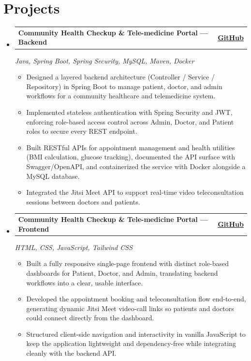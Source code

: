 \documentclass[letterpaper,11pt]{article}
\makeatletter
\newcommand{\resumeItem}[1]{
  \item{#1}
}
\newcommand{\resumeProjectHeading}[3]{
    \item
    \begin{tabular*}{\textwidth}{l@{\extracolsep{\fill}}r}
      \textbf{\large #1} & \textbf{#2} \\
    \end{tabular*}
    \textit{#3}
    \vspace{2pt}
}
\newcommand{\resumeSubHeadingListStart}{\begin{itemize}[leftmargin=0.0in, label={}, itemsep=6pt, topsep=0pt]}
\newcommand{\resumeSubHeadingListEnd}{\end{itemize}}
\newcommand{\resumeItemListStart}{\begin{itemize}[leftmargin=0.22in, itemsep=2pt, parsep=0pt, topsep=2pt, label=\textbullet]}
\newcommand{\resumeItemListEnd}{\end{itemize}\vspace{1pt}}
\makeatother
\begin{document}
\section{Projects}
    \resumeSubHeadingListStart

      \resumeProjectHeading
          {Community Health Checkup \& Tele-medicine Portal --- Backend}
          {\href{https://github.com/pranta2003/Community_Health_Checkup_and_Tele-medicine_Portal-Backend-Part}{GitHub}}
          {Java, Spring Boot, Spring Security, MySQL, Maven, Docker}
          \resumeItemListStart
            \resumeItem{Designed a layered backend architecture (Controller / Service / Repository) in Spring Boot to manage patient, doctor, and admin workflows for a community healthcare and telemedicine system.}
            \resumeItem{Implemented stateless authentication with Spring Security and JWT, enforcing role-based access control across Admin, Doctor, and Patient roles to secure every REST endpoint.}
            \resumeItem{Built RESTful APIs for appointment management and health utilities (BMI calculation, glucose tracking), documented the API surface with Swagger/OpenAPI, and containerized the service with Docker alongside a MySQL database.}
            \resumeItem{Integrated the Jitsi Meet API to support real-time video teleconsultation sessions between doctors and patients.}
          \resumeItemListEnd

      \resumeProjectHeading
          {Community Health Checkup \& Tele-medicine Portal --- Frontend}
          {\href{https://github.com/pranta2003/Community_Health_Checkup_and_Tele-medicine_Portal-Frontend_Part-}{GitHub}}
          {HTML, CSS, JavaScript, Tailwind CSS}
          \resumeItemListStart
            \resumeItem{Built a fully responsive single-page frontend with distinct role-based dashboards for Patient, Doctor, and Admin, translating backend workflows into a clear, usable interface.}
            \resumeItem{Developed the appointment booking and teleconsultation flow end-to-end, generating dynamic Jitsi Meet video-call links so patients and doctors could connect directly from the dashboard.}
            \resumeItem{Structured client-side navigation and interactivity in vanilla JavaScript to keep the application lightweight and dependency-free while integrating cleanly with the backend API.}
          \resumeItemListEnd

    \resumeSubHeadingListEnd

\newpage
\vspace*{0pt}
\end{document}
